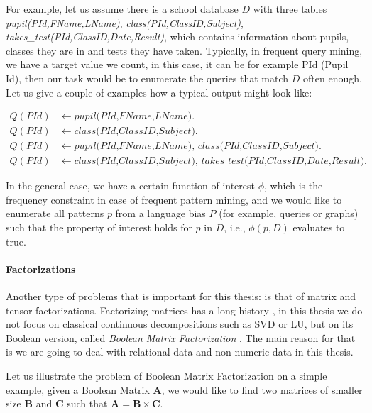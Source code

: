 For example, let us assume there is a school database $D$ with three
tables \textit{pupil(PId,FName,LName)},
\textit{class(PId,ClassID,Subject)}, \\
\textit{takes\_test(PId,ClassID,Date,Result)}, which contains
information about pupils, classes they are in and tests they have
taken. Typically, in frequent query mining, we have a target value we
count, in this case, it can be for example PId (Pupil Id), then our
task would be to enumerate the queries that match $D$ often enough.
Let us give a couple of examples how a typical output might look like:

\begin{equation*}
\begin{aligned}
Q(\textit{PId})&\leftarrow \textit{pupil(PId,FName,LName)}.\\
Q(\textit{PId})&\leftarrow \textit{class(PId,ClassID,Subject)}. \\
Q(\textit{PId})&\leftarrow \textit{pupil(PId,FName,LName), class(PId,ClassID,Subject)}.\\
Q(\textit{PId})&\leftarrow \textit{class(PId,ClassID,Subject), takes\_test(PId,ClassID,Date,Result)}.
\end{aligned}
\end{equation*}

In the general case, we have a certain function of interest $\phi$,
which is the frequency constraint in case of frequent pattern mining,
and we would like to enumerate all patterns $p$ from a language bias
$P$ (for example, queries or graphs) such that the property of
interest holds for $p$ in $D$, i.e., $\phi(p,D)$ evaluates to true.

\paragraph{Factorizations}
Another type of problems that is important for this thesis: is that of
matrix and tensor factorizations. Factorizing matrices has a long
history \parencite{matrix_book}, in this thesis we do not focus on
classical continuous decompositions such as SVD or LU, but on its
Boolean version, called \textit{Boolean Matrix
Factorization} \parencite{phd_miettinen}. The main reason for that is
we are going to deal with relational data and non-numeric data in this
thesis.


Let us illustrate the problem of Boolean Matrix Factorization on a
simple example, given a Boolean Matrix $\mathbf{A}$, we would like to find two
matrices of smaller size $\mathbf{B}$ and $\mathbf{C}$ such that
$\mathbf{A} = \mathbf{B} \times \mathbf{C}$.


